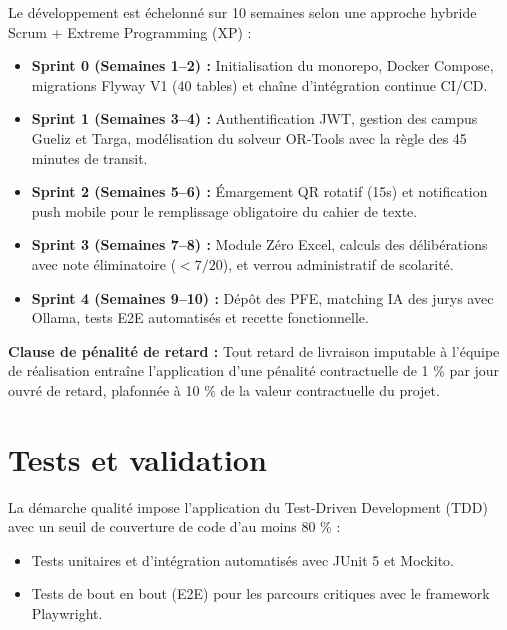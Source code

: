 \documentclass[11pt,a4paper]{report}
\begin{document}
Le développement est échelonné sur 10 semaines selon une approche hybride Scrum + Extreme Programming (XP) :
\begin{itemize}[leftmargin=1.5cm]
    \item \textbf{Sprint 0 (Semaines 1--2) :} Initialisation du monorepo, Docker Compose, migrations Flyway V1 (40 tables) et chaîne d'intégration continue CI/CD.
    \item \textbf{Sprint 1 (Semaines 3--4) :} Authentification JWT, gestion des campus Gueliz et Targa, modélisation du solveur OR-Tools avec la règle des 45 minutes de transit.
    \item \textbf{Sprint 2 (Semaines 5--6) :} Émargement QR rotatif (15s) et notification push mobile pour le remplissage obligatoire du cahier de texte.
    \item \textbf{Sprint 3 (Semaines 7--8) :} Module Zéro Excel, calculs des délibérations avec note éliminatoire ($< 7/20$), et verrou administratif de scolarité.
    \item \textbf{Sprint 4 (Semaines 9--10) :} Dépôt des PFE, matching IA des jurys avec Ollama, tests E2E automatisés et recette fonctionnelle.
\end{itemize}

\vspace{0.5cm}
\noindent\textbf{Clause de pénalité de retard :} Tout retard de livraison imputable à l'équipe de réalisation entraîne l'application d'une pénalité contractuelle de 1 \% par jour ouvré de retard, plafonnée à 10 \% de la valeur contractuelle du projet.

\chapter{Tests et validation}

La démarche qualité impose l'application du Test-Driven Development (TDD) avec un seuil de couverture de code d'au moins 80 \% :
\begin{itemize}[leftmargin=1.5cm]
    \item Tests unitaires et d'intégration automatisés avec JUnit 5 et Mockito.
    \item Tests de bout en bout (E2E) pour les parcours critiques avec le framework Playwright.
\end{itemize}
\end{document}
